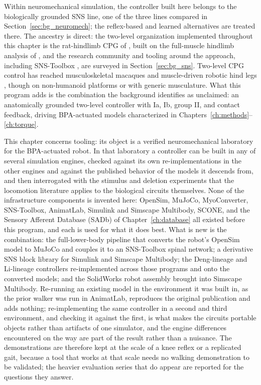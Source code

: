 Within neuromechanical simulation, the controller built here belongs to the biologically grounded SNS line, one of the three lines compared in Section~\ref{sec:bg_neuromech}; the reflex-based and learned alternatives \citep{geyer_musclereflex_2010, song_deep_2021} are treated there. The ancestry is direct: the two-level organization implemented throughout this chapter is the rat-hindlimb CPG of \citet{deng_neuromechanical_2019}, built on the full-muscle hindlimb analysis of \citet{young_analyzing_2019}, and the research community and tooling around the approach, including SNS-Toolbox \citep{nourse_sns_2023}, are surveyed in Section~\ref{sec:bg_sns}. Two-level CPG control has reached musculoskeletal macaques and muscle-driven robotic hind legs \citep{nishizaki_gait_2026, fukuoka_autonomous_2021}, though on non-humanoid platforms or with generic musculature. What this program adds is the combination the background identifies as unclaimed: an anatomically grounded two-level controller with Ia, Ib, group II, and contact feedback, driving BPA-actuated models characterized in Chapters~\ref{ch:methods}--\ref{ch:torque}.

This chapter concerns tooling: its object is a verified neuromechanical laboratory for the BPA-actuated robot. In that laboratory a controller can be built in any of several simulation engines, checked against its own re-implementations in the other engines and against the published behavior of the models it descends from, and then interrogated with the stimulus and deletion experiments that the locomotion literature applies to the biological circuits themselves. None of the infrastructure components is invented here: OpenSim, MuJoCo, MyoConverter, SNS-Toolbox, AnimatLab, Simulink and Simscape Multibody, SCONE, and the Sensory Afferent Database (SADb) of Chapter~\ref{ch:database} all existed before this program, and each is used for what it does best. What is new is the combination: the full-lower-body pipeline that converts the robot's OpenSim model to MuJoCo and couples it to an SNS-Toolbox spinal network; a derivative SNS block library for Simulink and Simscape Multibody; the Deng-lineage and Li-lineage controllers re-implemented across those programs and onto the converted models; and the SolidWorks robot assembly brought into Simscape Multibody. Re-running an existing model in the environment it was built in, as the prior walker was run in AnimatLab, reproduces the original publication and adds nothing; re-implementing the same controller in a second and third environment, and checking it against the first, is what makes the circuits portable objects rather than artifacts of one simulator, and the engine differences encountered on the way are part of the result rather than a nuisance. The demonstrations are therefore kept at the scale of a knee reflex or a replicated gait, because a tool that works at that scale needs no walking demonstration to be validated; the heavier evaluation series that do appear are reported for the questions they answer.

